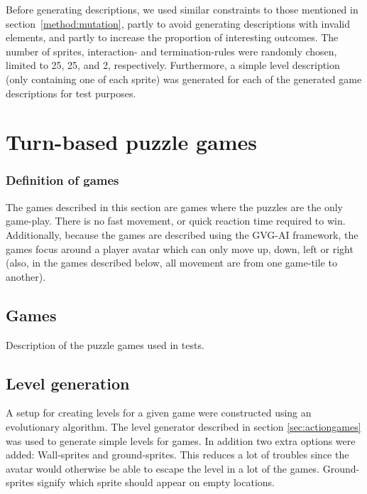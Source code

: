 \documentclass[a4paper,titlepage,final, twoside]{report}
\begin{document}

Before generating descriptions, we used similar constraints to those mentioned in section~\ref{method:mutation}, partly to avoid generating descriptions with invalid elements, and partly to increase the proportion of interesting outcomes. 
The number of sprites, interaction- and termination-rules were randomly chosen, limited to 25, 25, and 2, respectively. Furthermore, a simple level description (only containing one of each sprite) was generated for each of the generated game descriptions for test purposes. 



\section{Turn-based puzzle games}

\subsubsection*{Definition of games}
The games described in this section are games where the puzzles are the only game-play. There is no fast movement, or quick reaction time required to win. Additionally, because the games are described using the GVG-AI framework, the games focus around a player avatar which can only move up, down, left or right (also, in the games described below, all movement are from one game-tile to another).

\subsection{Games} 
Description of the puzzle games used in tests.

\subsection{Level generation} 
A setup for creating levels for a given game were constructed using an evolutionary algorithm. The level generator described in section \ref{sec:actiongames} was used to generate simple levels for games.  In addition two extra options were added: Wall-sprites and ground-sprites. This reduces a lot of troubles since the avatar would otherwise be able to escape the level in a lot of the games. Ground-sprites signify which sprite should appear on empty locations.
\end{document}

